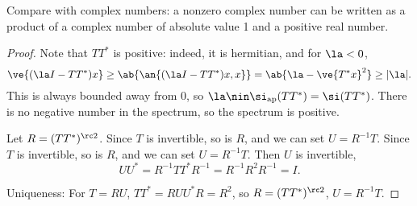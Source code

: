 Compare with complex numbers: a nonzero complex number can be written as a product of a complex number of absolute value 1 and a positive real number.
\begin{proof}
Note that $TT^*$ is positive: indeed, it is hermitian, and for $\la<0$, 
\[
\ve{(\la I-TT^*)x}\ge\ab{ \an{(\la I-T T^*)x,x}}=\ab{\la-\ve{T^*x}^2}\ge |\la|.
\]
This is always bounded away from 0, so $\la\nin \si_{\text{ap}}(TT^*)=\si(TT^*)$. There is no negative number in the spectrum, so the spectrum is positive.

Let $R=(TT^*)^{\rc 2}$. Since $T$ is invertible, so is $R$, and we can set $U=R^{-1}T$. Since $T$ is invertible, so is $R$, and we can set $U=R^{-1}T$. Then $U$ is invertible, 
\[
UU^*=R^{-1}TT^*R^{-1} = R^{-1}R^2R^{-1}=I.
\]

Uniqueness: For $T=RU$, $TT^*=RUU^*R=R^2$, so $R=(TT^*)^{\rc 2}$, $U=R^{-1}T$. 
\end{proof}

